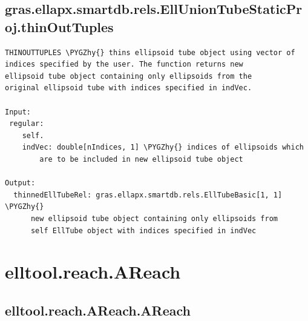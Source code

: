 \documentclass[letterpaper,10pt,english]{sphinxmanual}
\def\PYGZhy{\char`\-}
\begin{document}
\subsection{gras.ellapx.smartdb.rels.EllUnionTubeStaticProj.thinOutTuples}
\label{chap_functions:gras-ellapx-smartdb-rels-elluniontubestaticproj-thinouttuples}
\begin{Verbatim}[commandchars=\\\{\}]
THINOUTTUPLES \PYGZhy{} thins ellipsoid tube object using vector of
indices specified by the user. The function returns new
ellipsoid tube object containing only ellipsoids from the
original ellipsoid tube with indices specified in indVec.

Input:
 regular:
    self.
    indVec: double[nIndices, 1] \PYGZhy{} indices of ellipsoids which
        are to be included in new ellipsoid tube object

Output:
  thinnedEllTubeRel: gras.ellapx.smartdb.rels.EllTubeBasic[1, 1] \PYGZhy{}
      new ellipsoid tube object containing only ellipsoids from
      self EllTube object with indices specified in indVec
\end{Verbatim}


\section{elltool.reach.AReach}
\label{chap_functions:elltool-reach-areach}

\subsection{elltool.reach.AReach.AReach}
\label{chap_functions:elltool-reach-areach-areach}
\end{document}
